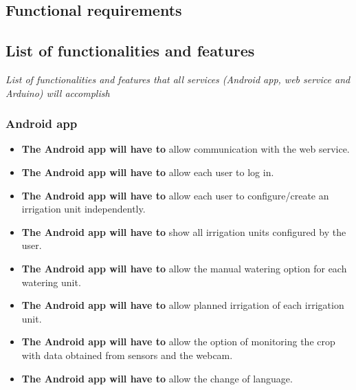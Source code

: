 \documentclass[11pt,a4paper]{article}
\begin{document}
\begin{enumerate}
\begin{enumerate}
	\end{enumerate}

\end{enumerate}

\subsection{Functional requirements}
\subsection{List of functionalities and features}
\textit{List of functionalities and features that all services (Android app, web service and Arduino) will accomplish}

\subsubsection{Android app}
\begin{itemize}
\item \textbf{The Android app will have to} allow communication with the web service.

\item \textbf{The Android app will have to} allow each user to log in.

\item \textbf{The Android app will have to} allow each user to configure/create an irrigation unit independently.

\item \textbf{The Android app will have to} show all irrigation units configured by the user.

\item \textbf{The Android app will have to} allow the manual watering option for each watering unit.

\item \textbf{The Android app will have to} allow planned irrigation of each irrigation unit.

\item \textbf{The Android app will have to} allow the option of monitoring the crop with data obtained from sensors and the webcam.

\item \textbf{The Android app will have to} allow the change of language.
\end{itemize}
\end{document}
